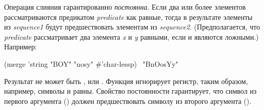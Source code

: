 \begin{defun}[Функция]
Операция слияния гарантированно \emph{постоянна}.
Если два или более элементов рассматриваются предикатом \emph{predicate} как
равные, тогда в результате элементы из \emph{sequence1} будут предшествовать
элементам из \emph{sequence2}.
(Предполагается, что \emph{predicate} рассматривает два элемента \emph{x} и
\emph{y} равными, если 
 и
 являются ложными.)
Например:
\begin{lisp}
(merge 'string "BOY" "nosy" \#'char-lessp) \EV\ "BnOosYy"
\end{lisp}
Результат не может быть ,  или .
Функция  игнорирует регистр, таким образом, например, символы  и
 равны. Свойство постоянности гарантирует, что символ из первого аргумента
() должен предшествовать символу из второго аргумента ().
\end{defun}

\fi